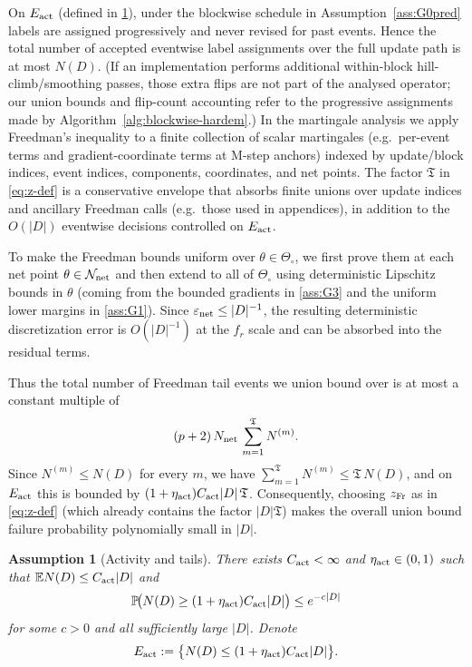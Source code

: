 \documentclass{statsoc}
\newtheorem{assumption}[assumption]{Assumption}
\newcommand{\bbE}{\mathbb{E}}
\newcommand{\bbP}{\mathbb{P}}
\newcommand{\1}{\mathbbm{1}}
\newcommand{\Tmax}{\mathfrak{T}}
\begin{document}
On $E_{\rm act}$ (defined in \cref{ass:G0}), under the blockwise schedule in Assumption~\ref{ass:G0pred} labels are assigned progressively and never revised for past events. Hence the total number of accepted eventwise label assignments over the full update path is at most $N(D)$. (If an implementation performs additional within-block hill-climb/smoothing passes, those extra flips are not part of the analysed operator; our union bounds and flip-count accounting refer to the progressive assignments made by Algorithm~\ref{alg:blockwise-hardem}.) In the martingale analysis we apply Freedman's inequality to a finite collection of scalar martingales (e.g.\ per-event terms and gradient-coordinate terms at M-step anchors) indexed by update/block indices, event indices, components, coordinates, and net points. The factor $\Tmax$ in \eqref{eq:z-def} is a conservative envelope that absorbs finite unions over update indices and ancillary Freedman calls (e.g.\ those used in appendices), in addition to the $O(|D|)$ eventwise decisions controlled on $E_{\rm act}$.

To make the Freedman bounds uniform over $\theta\in\Theta_\circ$, we first prove them at each net point $\theta\in\mathcal N_{\rm net}$ and then extend to all of $\Theta_\circ$ using deterministic Lipschitz bounds in $\theta$ (coming from the bounded gradients in \cref{ass:G3} and the uniform lower margins in \cref{ass:G1}). Since $\varepsilon_{\rm net}\le |D|^{-1}$, the resulting deterministic discretization error is $O(|D|^{-1})$ at the $f_r$ scale and can be absorbed into the residual terms.

Thus the total number of Freedman tail events we union bound over is at most a constant multiple of
\[
(p+2)\,N_{\rm net}\,\sum_{m=1}^{\Tmax} N^{(m)}.
\]
Since $N^{(m)}\le N(D)$ for every $m$, we have $\sum_{m=1}^{\Tmax}N^{(m)}\le \Tmax\,N(D)$, and on $E_{\rm act}$ this is
bounded by $(1+\eta_{\rm act})C_{\rm act}|D|\,\Tmax$. Consequently, choosing $z_{\rm Fr}$ as in \eqref{eq:z-def} (which already
contains the factor $|D|\Tmax$) makes the overall union bound failure probability polynomially small in $|D|$.


\begin{assumption}[Activity and tails]\label{ass:G0}
There exists $C_{\rm act}<\infty$ and $\eta_{\rm act}\in(0,1)$ such that $\bbE N(D)\le C_{\rm act}|D|$ and
\[
\bbP\!\big(N(D)\ge (1+\eta_{\rm act})C_{\rm act} |D|\big)\le e^{-c|D|}
\]
for some $c>0$ and all sufficiently large $|D|$. Denote
\[
E_{\rm act}:=\big\{N(D)\le (1+\eta_{\rm act})C_{\rm act} |D|\big\}.
\]
\end{assumption}
\end{document}
